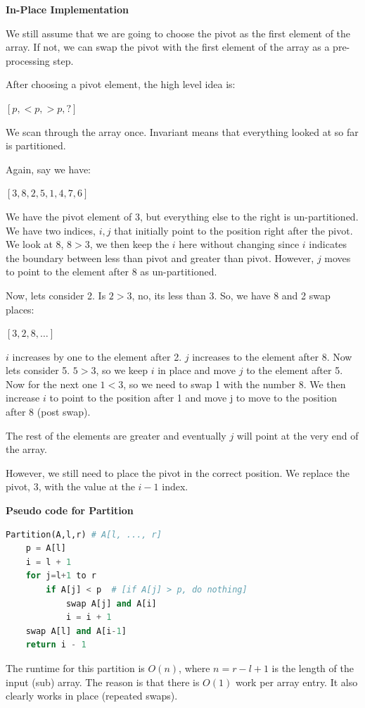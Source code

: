 \documentclass[11pt]{article}
\newcommand{\myeq}[1]{
    \vspace{11pt}
    \begin{center}
        ${#1}$
    \end{center}
    \vspace{11pt}
}
\newcommand{\boldsec}[1]{
    \vspace{11pt}
    \textbf{#1}
    \vspace{11pt}
}
\begin{document}
\boldsec{In-Place Implementation}

We still assume that we are going to choose the pivot as the first element of the array. If not, we can swap the pivot with the first element of the array as a pre-processing step.

After choosing a pivot element, the high level idea is:

\myeq{[p, <p, >p, ?]}

We scan through the array once. Invariant means that everything looked at so far is partitioned.

Again, say we have:

\myeq{[3,8,2,5,1,4,7,6]}

We have the pivot element of 3, but everything else to the right is un-partitioned. We have two indices, $i,j$ that initially point to the position right after the pivot. We look at 8, $8 > 3$, we then keep the $i$ here without changing since $i$ indicates the boundary between less than pivot and greater than pivot. However, $j$ moves to point to the element after 8 as un-partitioned.

Now, lets consider 2. Is $2 > 3$, no, its less than 3. So, we have 8 and 2 swap places:

\myeq{[3,2,8, \dots]}

$i$ increases by one to the element after 2. $j$ increases to the element after 8. Now lets consider 5. $5 > 3$, so we keep $i$ in place and move $j$ to the element after 5. Now for the next one $1 < 3$, so we need to swap 1 with the number 8. We then increase $i$ to point to the position after 1 and move j to move to the position after 8 (post swap). 

The rest of the elements are greater and eventually $j$ will point at the very end of the array. 

However, we still need to place the pivot in the correct position. We replace the pivot, 3, with the value at the $i - 1$ index.

\boldsec{Pseudo code for Partition}

\begin{lstlisting}[language=python, breaklines=true]
Partition(A,l,r) # A[l, ..., r]
    p = A[l] 
    i = l + 1
    for j=l+1 to r
        if A[j] < p  # [if A[j] > p, do nothing]
            swap A[j] and A[i]
            i = i + 1
    swap A[l] and A[i-1]
    return i - 1
\end{lstlisting}
\vspace{11pt}

The runtime for this partition is $O(n)$, where $n = r - l + 1$ is the length of the input (sub) array. The reason is that there is $O(1)$ work per array entry. It also clearly works in place (repeated swaps).
\end{document}
